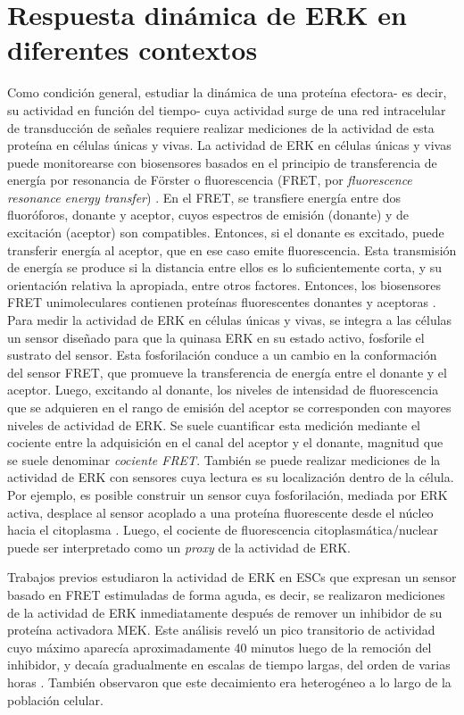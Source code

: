 \documentclass[./main.tex]{subfiles}
\begin{document}
\section{Respuesta dinámica de ERK en diferentes contextos}
\label{C1_sec:ERK}

Como condición general, estudiar la dinámica de una proteína efectora- es decir, su actividad en función del tiempo- cuya actividad surge de una red intracelular de transducción de señales requiere realizar mediciones de la actividad de esta proteína en células únicas y vivas. La actividad de ERK en células únicas y vivas puede monitorearse con biosensores basados en el principio de transferencia de energía por resonancia de Förster o fluorescencia (FRET, por \textit{fluorescence resonance energy transfer}) \cite{Komatsu2011}. En el FRET, se transfiere energía entre dos fluoróforos, donante y aceptor, cuyos espectros de emisión (donante) y de excitación (aceptor) son compatibles. Entonces, si el donante es excitado, puede transferir energía al aceptor, que en ese caso emite fluorescencia. Esta transmisión de energía se produce si la distancia entre ellos es lo suficientemente corta, y su orientación relativa la apropiada, entre otros factores. Entonces, los biosensores FRET unimoleculares contienen proteínas fluorescentes donantes y aceptoras  \cite{JaresErijman2003,Miyawaki2003}. Para medir la actividad de ERK en células únicas y vivas, se integra a las células un sensor diseñado para que la quinasa ERK en su estado activo, fosforile el sustrato del sensor. Esta fosforilación conduce a un cambio en la conformación del sensor FRET, que promueve la transferencia de energía entre el donante y el aceptor. Luego, excitando al donante, los niveles de intensidad de fluorescencia que se adquieren en el rango de emisión del aceptor se corresponden con mayores niveles de actividad de ERK. Se suele cuantificar esta medición mediante el cociente entre la adquisición en el canal del aceptor y el donante, magnitud que se suele denominar \emph{cociente FRET}. También se puede realizar mediciones de la actividad de ERK con sensores cuya lectura es su localización dentro de la célula. Por ejemplo, es posible construir un sensor cuya fosforilación, mediada por ERK activa, desplace al sensor acoplado a una proteína fluorescente desde el núcleo hacia el citoplasma \cite{Regot2014}. Luego, el cociente de fluorescencia citoplasmática/nuclear puede ser interpretado como un \textit{proxy} de la actividad de ERK.


Trabajos previos estudiaron la actividad de ERK en ESCs que expresan un sensor basado en FRET estimuladas de forma aguda, es decir, se realizaron mediciones de la actividad de ERK inmediatamente después de remover un inhibidor de su proteína activadora MEK. Este análisis reveló un pico transitorio de actividad cuyo máximo aparecía aproximadamente 40 minutos luego de la remoción del inhibidor, y decaía gradualmente en escalas de tiempo largas, del orden de varias horas \cite{Deathridge2019}. También observaron que este decaimiento era heterogéneo a lo largo de la población celular. 
\end{document}
